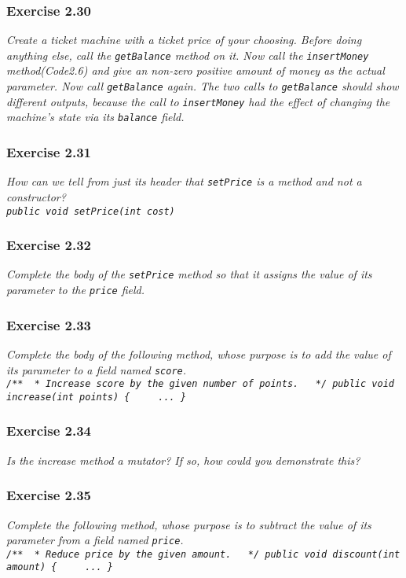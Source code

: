 \subsubsection*{Exercise 2.30}
\textit{Create a ticket machine with a ticket price of your choosing. Before 
doing anything else, call the \lstinline?getBalance? method on it. Now call the 
\lstinline?insertMoney? method(Code2.6) and give an non-zero positive amount of 
money as the actual parameter. Now call \lstinline?getBalance? again. The two 
calls to \lstinline?getBalance? should show different outputs, because the call 
to \lstinline?insertMoney? had the effect of changing the machine's state via 
its \lstinline?balance? field. }

\subsubsection*{Exercise 2.31}
\textit{How can we tell from just its header that \lstinline?setPrice? is a 
method and not a constructor? \\
\lstinline?public void setPrice(int cost)?}

\subsubsection*{Exercise 2.32}
\textit{Complete the body of the \lstinline?setPrice? method so that it 
assigns the value of its parameter to the \lstinline?price? field. }

\subsubsection*{Exercise 2.33}
\textit{Complete the body of the following method, whose purpose is to add the 
value of its parameter to a field named \lstinline?score?. \\
\lstinline?/**
 * Increase score by the given number of points. 
 */
public void increase(int points)
{
    ...
}?}

\subsubsection*{Exercise 2.34}
\textit{Is the increase method a mutator? If so, how could you demonstrate 
this? }

\subsubsection*{Exercise 2.35}
\textit{Complete the following method, whose purpose is to subtract the value 
of its parameter from a field named \lstinline?price?. \\
\lstinline?/**
 * Reduce price by the given amount. 
 */
public void discount(int amount)
{
    ...
}?}

